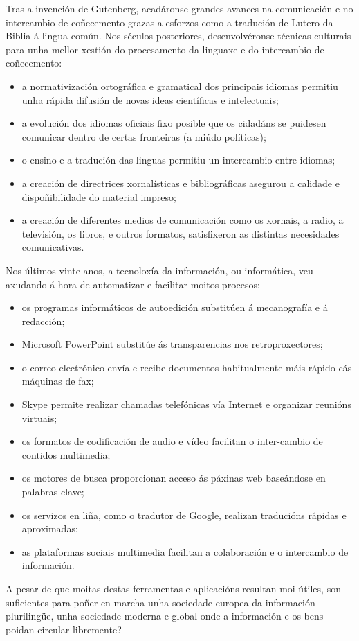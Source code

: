 \begin{multicols}{2}
 Tras a invención de Gutenberg, acadáronse grandes avances na comunicación e no intercambio de coñecemento grazas a esforzos como a tradución de Lutero da Biblia á lingua común. Nos séculos posteriores, desenvolvéronse técnicas culturais para unha mellor xestión do procesamento da linguaxe e do intercambio de coñecemento:
\begin{itemize}
\item a normativización ortográfica e gramatical dos principais idiomas permitiu unha rápida difusión de novas ideas científicas e intelectuais;
\item a evolución dos idiomas oficiais fixo posible que os cidadáns se puidesen comunicar dentro de certas fronteiras (a miúdo políticas);
\item o ensino e a tradución das linguas permitiu un intercambio entre idiomas;
\item a creación de directrices xornalísticas e bibliográficas asegurou a calidade e dispoñibilidade do material impreso;
\item a creación de diferentes medios de comunicación como os xornais, a radio, a televisión, os libros, e outros formatos, satisfixeron as distintas necesidades comunicativas. 
\end{itemize}
Nos últimos vinte anos, a tecnoloxía da información, ou informática, veu axudando á hora de automatizar e facilitar moitos procesos:
\begin{itemize}
\item os programas informáticos de autoedición substitúen á mecanografía e á redacción;
\item Microsoft PowerPoint substitúe ás transparencias nos retroproxectores;
\item o correo electrónico envía e recibe documentos habitualmente máis rápido cás máquinas de fax; 
\item Skype permite realizar chamadas telefónicas vía Internet e organizar reunións virtuais;
\item os formatos de codificación de audio e vídeo facilitan o inter-cambio de contidos multimedia;
\item os motores de busca proporcionan acceso ás páxinas web baseándose en palabras clave;
\item os servizos en liña, como o tradutor de Google, realizan traducións rápidas e aproximadas;
\item as plataformas sociais multimedia facilitan a colaboración e o intercambio de información.
\end{itemize}
A pesar de que moitas destas ferramentas e aplicacións resultan moi útiles, son suficientes para poñer en marcha unha sociedade europea da información plurilingüe, unha sociedade moderna e global onde a información e os bens poidan circular libremente?


\end{multicols}
